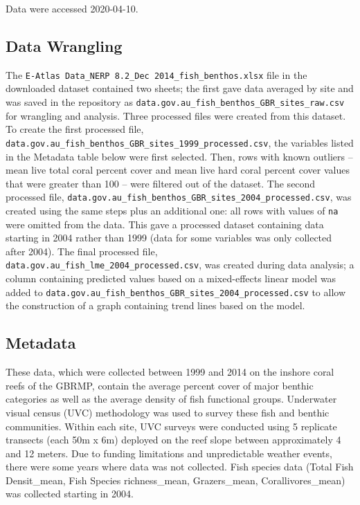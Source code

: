 \documentclass[12pt,]{article}
\begin{document}
Data were accessed 2020-04-10.

\hypertarget{data-wrangling}{%
\subsection{Data Wrangling}\label{data-wrangling}}

The \texttt{E-Atlas\ Data\_NERP\ 8.2\_Dec\ 2014\_fish\_benthos.xlsx}
file in the downloaded dataset contained two sheets; the first gave data
averaged by site and was saved in the repository as
\texttt{data.gov.au\_fish\_benthos\_GBR\_sites\_raw.csv} for wrangling
and analysis. Three processed files were created from this dataset. To
create the first processed file,
\texttt{data.gov.au\_fish\_benthos\_GBR\_sites\_1999\_processed.csv},
the variables listed in the Metadata table below were first selected.
Then, rows with known outliers -- mean live total coral percent cover
and mean live hard coral percent cover values that were greater than 100
-- were filtered out of the dataset. The second processed file,
\texttt{data.gov.au\_fish\_benthos\_GBR\_sites\_2004\_processed.csv},
was created using the same steps plus an additional one: all rows with
values of \texttt{na} were omitted from the data. This gave a processed
dataset containing data starting in 2004 rather than 1999 (data for some
variables was only collected after 2004). The final processed file,
\texttt{data.gov.au\_fish\_lme\_2004\_processed.csv}, was created during
data analysis; a column containing predicted values based on a
mixed-effects linear model was added to
\texttt{data.gov.au\_fish\_benthos\_GBR\_sites\_2004\_processed.csv} to
allow the construction of a graph containing trend lines based on the
model.

\hypertarget{metadata}{%
\subsection{Metadata}\label{metadata}}

These data, which were collected between 1999 and 2014 on the inshore
coral reefs of the GBRMP, contain the average percent cover of major
benthic categories as well as the average density of fish functional
groups. Underwater visual census (UVC) methodology was used to survey
these fish and benthic communities. Within each site, UVC surveys were
conducted using 5 replicate transects (each 50m x 6m) deployed on the
reef slope between approximately 4 and 12 meters. Due to funding
limitations and unpredictable weather events, there were some years
where data was not collected. Fish species data (Total Fish
Densit\_mean, Fish Species richness\_mean, Grazers\_mean,
Corallivores\_mean) was collected starting in 2004.
\end{document}
